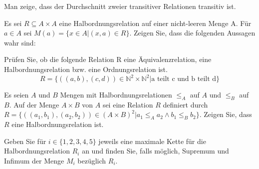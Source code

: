 \documentclass[10pt, a4paper]{exam}
\begin{document}
\begin{questions}
    \question Man zeige, dass der Durchschnitt zweier transitiver Relationen transitiv ist.
    \begin{solution}
    \end{solution}

    \question Es sei $R\subseteq A\times A$ eine Halbordnungsrelation auf einer nicht-leeren Menge A. Für $a\in A$ sei $M(a)=\{x\in A |(x, a)\in R\}$. Zeigen Sie, dass die folgenden Aussagen wahr sind:

    \question Prüfen Sie, ob die folgende Relation R eine Äquivalenzrelation, eine Halbordnungsrelation bzw. eine Ordnungsrelation ist. $$R=\{((a, b), (c, d))\in \mathbb{N}^2\times\mathbb{N}^2 | \text{a teilt c und b teilt d}\}$$
    \begin{solution}
    \end{solution}

    \question Es seien $A$ und $B$ Mengen mit Halbordnungsrelationen $\leq_A$ auf $A$ und $\leq_B$ auf $B$. Auf der Menge $A\times B$ von $A$ sei eine Relation $R$ definiert durch $R=\{((a_1, b_1), (a_2, b_2))\in (A\times B)^2 | a_1\leq_A a_2 \wedge b_1 \leq_B b_2\}$. Zeigen Sie, dass $R$ eine Halbordnungsrelation ist.
    \begin{solution}
    \end{solution}

    \question Geben Sie für $i\in\{1, 2, 3, 4, 5\}$ jeweils eine maximale Kette für die Halbordnungsrelation $R_i$ an und finden Sie, falls möglich, Supremum und Infimum der Menge $M_i$ bezüglich $R_i$.
\end{questions}
\end{document}

